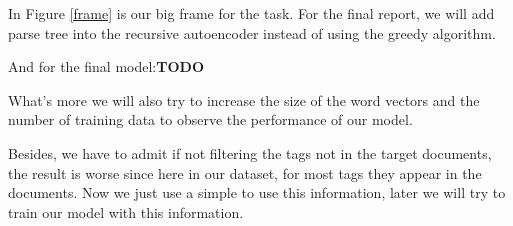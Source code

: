 \documentclass[dvips,12pt]{article}
\begin{document}
    In Figure \ref{frame} is our big frame for the task. For the final report, we will add parse tree into the recursive autoencoder instead of using the greedy algorithm.
    
    And for the final model:\textbf{TODO}
    
    What's more we will also try to increase the size of the word vectors and the number of training data to observe the performance of our model.
    
    Besides, we have to admit if not filtering the tags not in the target documents, the result is worse since here in our dataset, for most tags they appear in the documents. Now we just use a simple to use this information, later we will try to train our model with this information.
	
	
\end{document}
